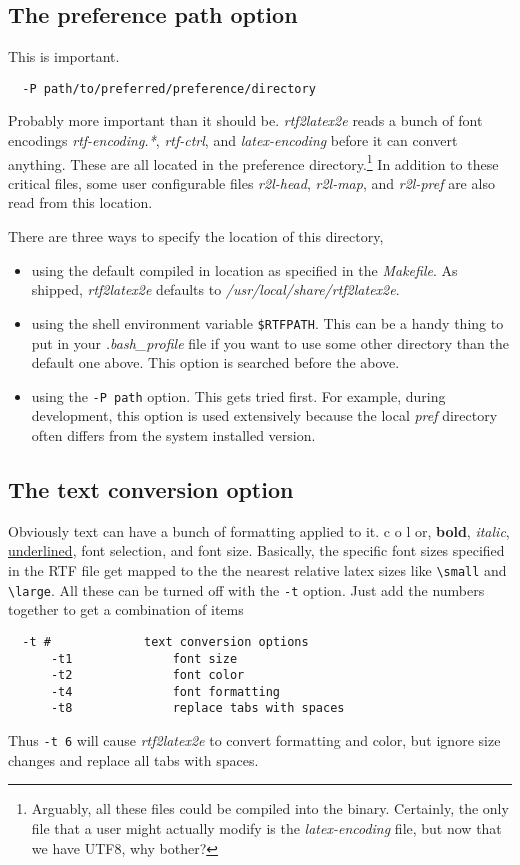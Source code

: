 \documentclass{article}
\def\rtf2latex2e{{\it rtf2latex2e}}
\begin{document}
\subsection{The preference path option}
This is important.  
\begin{verbatim}
  -P path/to/preferred/preference/directory
\end{verbatim}
Probably more important than it should be. \rtf2latex2e{}
reads a bunch of font encodings \textit{rtf-encoding.*}, \textit{rtf-ctrl}, and
\textit{latex-encoding} before it can convert anything.  These are all located
in the preference directory.\footnote{Arguably, all these files could be compiled
into the binary.  Certainly, the only file that a user might actually modify 
is the \textit{latex-encoding} file, but now that we have UTF8, why bother?} 
In addition to these critical files, some user configurable files \textit{r2l-head},
\textit{r2l-map}, and \textit{r2l-pref} are also read from this location.

There are three ways to specify the location of this directory, 
\begin{itemize}
\item
using the default compiled in location as specified in the \textit{Makefile}.  As
shipped, \rtf2latex2e{} defaults to \textit{/usr/local/share/rtf2latex2e}.
\item
using the shell environment variable \texttt{\$RTFPATH}.  This can be a handy thing
to put in your \textit{.bash\_profile} file if you want to use some other directory
than the default one above.  This option is searched before the above.
\item
using the \texttt{-P path} option.  This gets tried first.  For example, during
development, this option is used extensively because the local \textit{pref}
directory often differs from the system installed version.
\end{itemize}

\subsection{The text conversion option}

Obviously text can have a bunch of formatting applied to it.
{\color{color6} c}{\color{color2} o}{\color{color4} l}{\color{color10}
o}r, {\bf bold}, {\em italic}, {\underline {underlined}}, font selection,
and font size. Basically, the
specific font sizes specified in the RTF file get mapped to the 
the nearest relative latex sizes like \verb#\small# and \verb#\large#.
All these can be turned off with the \texttt{-t} option.  Just add the
numbers together to get a combination of items
\begin{verbatim}
  -t #             text conversion options
      -t1              font size
      -t2              font color
      -t4              font formatting
      -t8              replace tabs with spaces
\end{verbatim}
Thus \texttt{-t 6}          
will cause \rtf2latex2e{} to convert formatting and color, but
ignore size changes and replace all tabs with spaces.
\end{document}

